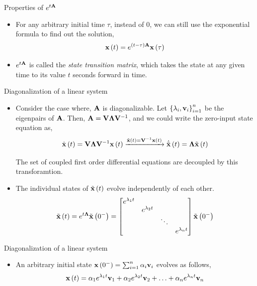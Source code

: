 \documentclass[aspectratio=169]{beamer}
\def\mf{\ensuremath\mathbf}
\def\lp{\ensuremath\left(}
\def\rp{\ensuremath\right)}
\def\lc{\ensuremath\left\{}
\def\rc{\ensuremath\right\}}
\def\bmx{\ensuremath\begin{bmatrix*}[r]}
\def\emx{\ensuremath\end{bmatrix*}}
\newcommand{\ct}[1]{\lp #1\rp}
\begin{document}
\begin{frame}[t]{Properties of $e^{t\mf{A}}$}
\begin{itemize}
    \item For any arbitrary initial time $\tau$, instead of $0$, we can still use the exponential formula to find out the solution,
    \[ \mf{x}\ct{t} = e^{\lp t - \tau\rp\mf{A}}\mf{x}\ct{\tau} \]

    \item $e^{t\mf{A}}$ is called the \textit{state transition matrix}, which takes the state at any given time to its value $t$ seconds forward in time.
\end{itemize}
\end{frame}


\begin{frame}[t]{Diagonalization of a linear system}
\begin{itemize}
    \item Consider the case where, $\mf{A}$ is diagonalizable. Let $\lc\lambda_i, \mf{v}_i\rc_{i=1}^n$ be the eigenpairs of $\mf{A}$. Then, $\mf{A} = \mf{V}\mf{\Lambda}\mf{V}^{-1}$, and we could write the zero-input state equation as,
    \[ \dot{\mf{x}}\ct{t} = \mf{V}\mf{\Lambda}\mf{V}^{-1}\mf{x}\ct{t} \xrightarrow[]{\tilde{\mf{x}}\ct{t} = \mf{V}^{-1}\mf{x}\ct{t}} \dot{\tilde{\mf{x}}}\ct{t} = \mf{\Lambda}\tilde{\mf{x}}\ct{t} \]

    The set of coupled first order differential equations are decoupled by this transforamtion.

    \item The individual states of $\tilde{\mf{x}}\ct{t}$ evolve independently of each other.
    $$\tilde{\mf{x}}\ct{t} = e^{t\mf{\Lambda}}\tilde{\mf{x}}\ct{0^-} = \bmx 
    e^{\lambda_1 t} & & & \\
     & e^{\lambda_2 t} & & \\
     & & \ddots & \\
     & & & e^{\lambda_n t}
    \emx \tilde{\mf{x}}\ct{0^-}$$
\end{itemize}
\end{frame}


\begin{frame}[t]{Diagonalization of a linear system}
\begin{itemize}
    \item An arbitrary initial state $\mf{x}\ct{0^-} = \sum_{i=1}^{n}\alpha_i\mf{v}_i$ evolves as follows,
    \[ \mf{x}\ct{t} = \alpha_1e^{\lambda_1t}\mf{v}_1 + \alpha_2e^{\lambda_2t}\mf{v}_2 + \ldots + \alpha_ne^{\lambda_nt}\mf{v}_n\]
\end{itemize}
\end{frame}
\end{document}

